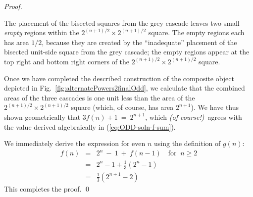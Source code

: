 \begin{proof}
\begin{enumerate}
\begin{enumerate}
\smallskip

The placement of the bisected squares from the grey cascade leaves two small {\em empty} regions within the $2^{(n+1)/2} \times 2^{(n+1)/2}$ square.  The empty regions each has area $1/2$, because they are created by the ``inadequate'' placement of the bisected unit-side
square from the grey cascade; the empty regions appear at the top right and bottom right corners of the $2^{(n+1)/2} \times 2^{(n+1)/2}$ square.
  \end{enumerate}
\end{enumerate}

Once we have completed the described construction of the composite object depicted in Fig.~\ref{fig:alternatePowers2finalOdd}, we calculate that the combined areas of the three cascades is one unit less than the area of the $2^{(n+1)/2} \times 2^{(n+1)/2}$ square (which, of course, has area $2^{n+1}$).  We have thus shown geometrically that $3 f(n)+1 \ = \ 2^{n+1}$, which {\em (of course!)}~agrees with the value derived algebraically in
(\ref{eq:ODD-soln-f-sum}).

\bigskip

We immediately derive the expression for even $n$ using the definition of $g(n)$:
\begin{eqnarray*}
f(n) & = & 2^n \ - \ 1 \ + \ f(n-1) \ \ \ \mbox{ for } \ n \geq 2 \\
       & = & 2^n -1 + \frac{1}{3} \left(2^{n} - 1 \right) \\
       & = &  \frac{1}{3} \left(2^{n+1} - 2 \right)
\end{eqnarray*}
This completes the proof.  \qed
\end{proof}

